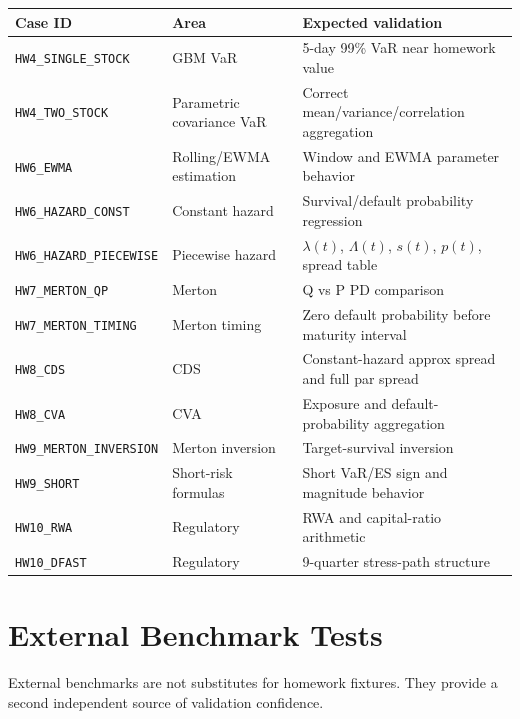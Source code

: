 \documentclass[11pt]{article}
\newcommand{\code}[1]{\texttt{#1}}
\begin{document}
\begin{center}
\begin{tabular}{L{4.5cm}L{3cm}L{6cm}}
\toprule
\textbf{Case ID} & \textbf{Area} & \textbf{Expected validation} \\
\midrule
\code{HW4\_SINGLE\_STOCK}    & GBM VaR                   & 5-day 99\% VaR near homework value \\
\code{HW4\_TWO\_STOCK}       & Parametric covariance VaR & Correct mean/variance/correlation aggregation \\
\code{HW6\_EWMA}             & Rolling/EWMA estimation   & Window and EWMA parameter behavior \\
\code{HW6\_HAZARD\_CONST}    & Constant hazard           & Survival/default probability regression \\
\code{HW6\_HAZARD\_PIECEWISE}& Piecewise hazard          & $\lambda(t)$, $\Lambda(t)$, $s(t)$, $p(t)$, spread table \\
\code{HW7\_MERTON\_QP}       & Merton                    & Q vs P PD comparison \\
\code{HW7\_MERTON\_TIMING}   & Merton timing             & Zero default probability before maturity interval \\
\code{HW8\_CDS}              & CDS                       & Constant-hazard approx spread and full par spread \\
\code{HW8\_CVA}              & CVA                       & Exposure and default-probability aggregation \\
\code{HW9\_MERTON\_INVERSION}& Merton inversion          & Target-survival inversion \\
\code{HW9\_SHORT}            & Short-risk formulas       & Short VaR/ES sign and magnitude behavior \\
\code{HW10\_RWA}             & Regulatory                & RWA and capital-ratio arithmetic \\
\code{HW10\_DFAST}           & Regulatory                & 9-quarter stress-path structure \\
\bottomrule
\end{tabular}
\end{center}

\section{External Benchmark Tests}

External benchmarks are not substitutes for homework fixtures.
They provide a second independent source of validation confidence.
\end{document}
